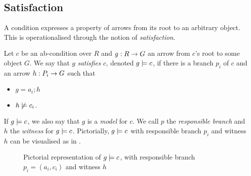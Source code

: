 \subsection{Satisfaction}

A condition expresses a property of arrows from its root to an arbitrary object. This is operationalised through the notion of \emph{satisfaction}.

\begin{definition}
  Let $c$ be an ab-condition over $R$ and $g:R\rightarrow G$ an arrow from $c$'s root to some object $G$. We say that \emph{$g$ satisfies $c$}, denoted $g\models c$, if there is a branch $p_i$ of $c$ and an arrow $h:P_i\rightarrow G$ such that
  \begin{itemize}
  \item $g=a_i;h$
  \item $h\not\models c_i$.
  \end{itemize}
\end{definition}
%
If $g\models c$, we also say that $g$ is a \emph{model} for $c$. We call $p$ the \emph{responsible branch} and $h$ the \emph{witness} for $g\models c$. Pictorially, $g\models c$ with responsible branch $p_i$ and witness $h$ can be visualised as in .
%
\begin{figure}
  \centering
  
  \caption{Pictorial representation of $g\models c$, with responsible branch $p_i=(a_i,c_i)$ and witness $h$}
\end{figure}

